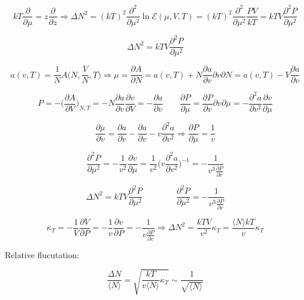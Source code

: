 	$$kT\frac{\partial}{\partial\mu} = z\frac{\partial}{\partial z}\Rightarrow\Delta N^2 = (kT)^2\frac{\partial^2}{\partial\mu^2}\ln\mathcal{E}(\mu, V, T) = (kT)^2\frac{\partial^2}{\partial\mu^2}\frac{PV}{kT} = kTV\frac{\partial^2 P}{\partial\mu^2}$$

	$$\Delta N^2 = kTV\frac{\partial^2 P}{\partial \mu^2}$$

	$$a(v, T) = \frac{1}{N}A\biggl(N, \frac{V}{N}, T\biggr) \Rightarrow \mu = \frac{\partial A}{\partial N} = a(v, T) + N\frac{\partial a}{\partial v}{\partial v}{\partial N} = a(v, T) - V\frac{\partial a}{\partial v}$$

	$$P = -\biggl(\frac{\partial A}{\partial V}\biggr)_{N, T} = -N\frac{\partial a}{\partial v}\frac{\partial v}{\partial V} = -\frac{\partial a}{\partial v}\qquad\frac{\partial P}{\partial\mu} = \frac{\partial P}{\partial  v}{\partial v}{\partial\mu} = -\frac{\partial^2 a}{\partial v^2}\frac{\partial v}{\partial \mu}$$

	$$\frac{\partial\mu}{\partial v} = \frac{\partial a}{\partial v}-\frac{\partial a}{\partial v} - v \frac{\partial^2a}{\partial v^2}\Rightarrow \frac{\partial P}{\partial\mu} = \frac{1}{v}$$

	$$\frac{\partial^2P}{\partial\mu^2} = -\frac{1}{v^2}\frac{\partial v}{\partial\mu} = \frac{1}{v^2}\biggl(v\frac{\partial^2 a}{\partial v^2}\biggr)^{-1} = -\frac{1}{v^3\frac{\partial P}{\partial v}}$$

	$$\Delta N^2 = kTV\frac{\partial^2 P}{\partial\mu^2}\qquad\qquad\frac{\partial^2 P}{\partial\mu^2} = -\frac{1}{v^3\frac{\partial P}{\partial v}}$$

	$$\kappa_T = -\frac{1}{V}\frac{\partial V}{\partial P} = -\frac{1}{v}\frac{\partial v}{\partial P} = -\frac{1}{v\frac{\partial P}{\partial v}}\Rightarrow\Delta N^2 = \frac{kTV}{v^2}\kappa_T = \frac{\langle N\rangle kT}{v}\kappa_T$$

	Relative flucutation:

	$$\frac{\Delta N}{\langle N\rangle} = \sqrt{\frac{kT}{v\langle N\rangle}\kappa_T}\sim\frac{1}{\sqrt{\langle N\rangle}}$$
